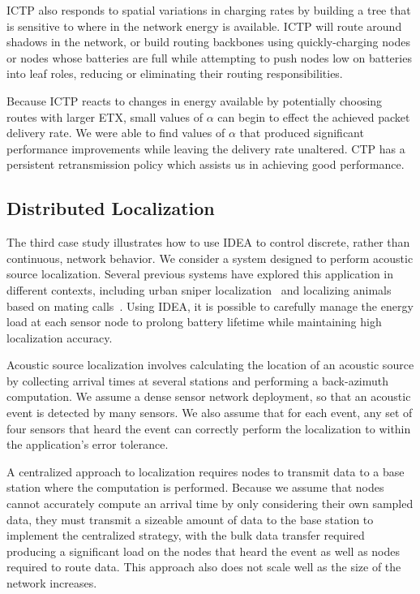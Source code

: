 ICTP also responds to spatial variations in charging rates by building a tree
that is sensitive to where in the network energy is available. ICTP will
route around shadows in the network, or build routing backbones using
quickly-charging nodes or nodes whose batteries are full while attempting to
push nodes low on batteries into leaf roles, reducing or eliminating their
routing responsibilities.

Because ICTP reacts to changes in energy available by potentially choosing
routes with larger ETX, small values of $\alpha$ can begin to effect the
achieved packet delivery rate. We were able to find values of $\alpha$ that
produced significant performance improvements while leaving the delivery rate
unaltered. CTP has a persistent retransmission policy which assists us in
achieving good performance.

\subsection{Distributed Localization}

The third case study illustrates how to use IDEA to control discrete, rather
than continuous, network behavior. We consider a system designed to perform acoustic
source localization. Several previous systems have explored this application
in different contexts, including urban sniper
localization~\cite{shooter-localization} and localizing animals based on
mating calls~\cite{girod-marmots}.  Using IDEA, it is possible to carefully
manage the energy load at each sensor node to prolong battery lifetime while
maintaining high localization accuracy.

Acoustic source localization involves calculating the location of an acoustic
source by collecting arrival times at several stations and performing a
back-azimuth computation. We assume a dense sensor network deployment, so
that an acoustic event is detected by many sensors. We also assume that for
each event, any set of four sensors that heard the event can correctly
perform the localization to within the application's error tolerance. 

A centralized approach to localization requires nodes to transmit data to a
base station where the computation is performed. Because we assume that nodes
cannot accurately compute an arrival time by only considering their own
sampled data, they must transmit a sizeable amount of data to the base
station to implement the centralized strategy, with the bulk data transfer
required producing a significant load on the nodes that heard the event as
well as nodes required to route data. This approach also does not scale well
as the size of the network increases.

